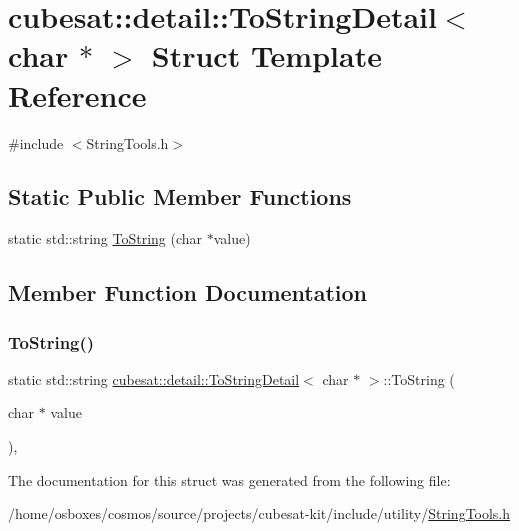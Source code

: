 \hypertarget{structcubesat_1_1detail_1_1ToStringDetail_3_01char_01_5_01_4}{}\section{cubesat\+:\+:detail\+:\+:To\+String\+Detail$<$ char $\ast$ $>$ Struct Template Reference}
\label{structcubesat_1_1detail_1_1ToStringDetail_3_01char_01_5_01_4}


{\ttfamily \#include $<$String\+Tools.\+h$>$}

\subsection*{Static Public Member Functions}
\begin{DoxyCompactItemize}
\item 
static std\+::string \hyperlink{structcubesat_1_1detail_1_1ToStringDetail_3_01char_01_5_01_4_affa39d3b68c651db8d2aece034c6735c}{To\+String} (char $\ast$value)
\end{DoxyCompactItemize}


\subsection{Member Function Documentation}
\mbox{\label{structcubesat_1_1detail_1_1ToStringDetail_3_01char_01_5_01_4_affa39d3b68c651db8d2aece034c6735c}} 
\subsubsection{\texorpdfstring{To\+String()}{ToString()}}
{\footnotesize\ttfamily static std\+::string \hyperlink{structcubesat_1_1detail_1_1ToStringDetail}{cubesat\+::detail\+::\+To\+String\+Detail}$<$ char $\ast$ $>$\+::To\+String (\begin{DoxyParamCaption}\item[{char $\ast$}]{value }\end{DoxyParamCaption})\hspace{0.3cm}{\ttfamily [inline]}, {\ttfamily [static]}}



The documentation for this struct was generated from the following file\+:\begin{DoxyCompactItemize}
\item 
/home/osboxes/cosmos/source/projects/cubesat-\/kit/include/utility/\hyperlink{StringTools_8h}{String\+Tools.\+h}\end{DoxyCompactItemize}
